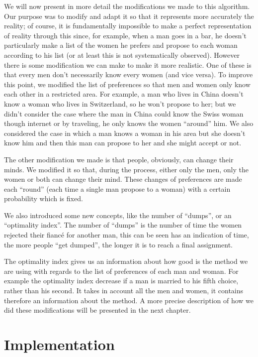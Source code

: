 \documentclass[11pt]{article}
\begin{document}
We will now present in more detail the modifications we made to this algorithm. Our purpose was 
to modify and adapt it so that it represents more accurately the reality; of course, it is fundamentally 
impossible to make a perfect representation of reality through this since, for example, when a man 
goes in a bar, he doesn’t particularly make a list of the women he prefers and propose to each 
woman according to his list (or at least this is not systematically observed).
However there is some modification we can make to make it more realistic. One of these is that 
every men don’t necessarily know every women (and vice versa). To improve this point, we modified 
the list of preferences so that men and women only know each other in a restricted area. For 
example, a man who lives in China doesn’t know a woman who lives in Switzerland, so he won’t 
propose to her; but we didn’t consider the case where the man in China could know the Swiss 
woman though internet or by traveling, he only knows the women “around” him. We also considered 
the case in which a man knows a woman in his area but she doesn’t know him and then this man can 
propose to her and she might accept or not.

The other modification we made is that people, obviously, can change their minds. We modified it so 
that, during the process, either only the men, only the women or both can change their mind. These 
changes of preferences are made each “round” (each time a single man propose to a woman) with a 
certain probability which is fixed.

We also introduced some new concepts, like the number of “dumps”, or an “optimality index”. The 
number of “dumps” is the number of time the women rejected their fiancé for another man, this can 
be seen has an indication of time, the more people “get dumped”, the longer it is to reach a final 
assignment.

The optimality index gives us an information about how good is the method we are using with 
regards to the list of preferences of each man and woman. For example the optimality index 
decrease if a man is married to his fifth choice, rather than his second. It takes in account all the men 
and women, it contains therefore an information about the method.
A more precise description of how we did these modifications will be presented in the next chapter.

\section{Implementation}
\end{document}
